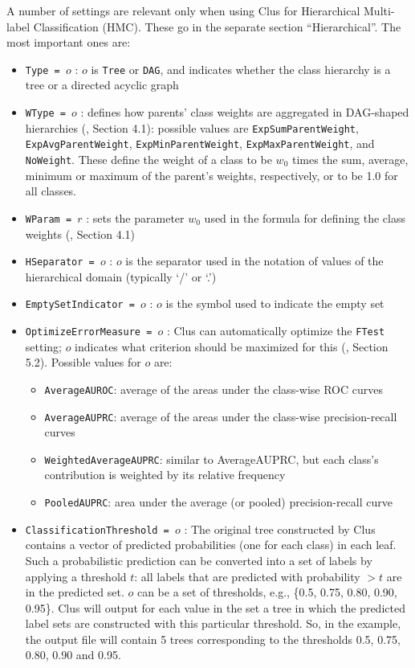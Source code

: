 \documentclass[a4paper]{report}
\begin{document}
A number of settings are relevant only when using Clus for Hierarchical Multi-label Classification (HMC).  These go in the separate section ``Hierarchical''.  The most important ones are:

\begin{itemize}
\item {\tt Type = $o$} : $o$ is {\tt Tree} or {\tt DAG}, and indicates whether the class hierarchy is a tree or a directed acyclic graph \cite{hmc-paper}
\item {\tt WType = $o$} : defines how parents' class weights are aggregated in DAG-shaped hierarchies (\cite{Vens08:jrnl}, Section 4.1): possible values are {\tt ExpSumParentWeight}, {\tt ExpAvgParentWeight}, {\tt ExpMinParentWeight}, {\tt ExpMaxParentWeight}, and {\tt NoWeight}.  These define the weight of a class to be $w_0$ times the sum, average, minimum or maximum of the parent's weights, respectively, or to be 1.0 for all classes. 
\item {\tt WParam = $r$} : sets the parameter $w_0$ used in the formula for defining the class weights (\cite{Vens08:jrnl}, Section 4.1)
\item {\tt HSeparator = $o$} : $o$ is the separator used in the notation of values of the hierarchical domain (typically `/' or `.') 
\item {\tt EmptySetIndicator = $o$} : $o$ is the symbol used to indicate the empty set
\item {\tt OptimizeErrorMeasure = $o$} : Clus can automatically optimize the {\tt FTest} setting; $o$ indicates what criterion should be maximized for this (\cite{Vens08:jrnl}, Section 5.2).  Possible values for $o$ are:
  \begin{itemize}
   \item {\tt AverageAUROC}: average of the areas under the class-wise ROC curves
   \item {\tt AverageAUPRC}: average of the areas under the class-wise precision-recall curves
   \item {\tt WeightedAverageAUPRC}: similar to AverageAUPRC, but each class's contribution is                         weighted by its relative frequency
   \item {\tt PooledAUPRC}: area under the average (or pooled) precision-recall curve
  \end{itemize}
\item {\tt ClassificationThreshold = $o$} : The original tree constructed by Clus contains a vector of predicted probabilities (one for each class) in each leaf. Such a probabilistic prediction can be converted into a set of labels by applying a threshold $t$: all labels that are predicted with probability $> t$ are in the predicted set.  $o$ can be a set of thresholds, e.g., \{0.5, 0.75, 0.80, 0.90, 0.95\}. Clus will output for each value in the set a tree in which the predicted label sets are constructed with this particular threshold. So, in the example, the output file will contain 5 trees corresponding to the thresholds 0.5, 0.75, 0.80, 0.90 and 0.95.

\end{itemize}
\end{document}
